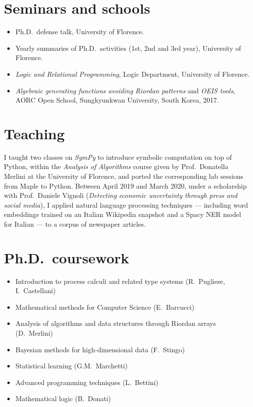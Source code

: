 \documentclass[11pt,a4paper]{article}
\begin{document}
\section*{Seminars and schools}

\begin{itemize}[leftmargin=1.4em,itemsep=0.3em]
\item Ph.D.\ defense talk, University of Florence.
\item Yearly summaries of Ph.D.\ activities (1st, 2nd and 3rd year), University of Florence.
\item \emph{Logic and Relational Programming}, Logic Department, University of Florence.
\item \emph{Algebraic generating functions avoiding Riordan patterns} and \emph{OEIS tools}, AORC Open School, Sungkyunkwan University, South Korea, 2017.
\end{itemize}

\section*{Teaching}

I taught two classes on \emph{SymPy} to introduce symbolic computation on top of Python, within the \emph{Analysis of Algorithms} course given by Prof.\ Donatella Merlini at the University of Florence, and ported the corresponding lab sessions from Maple to Python. Between April 2019 and March 2020, under a scholarship with Prof.\ Daniele Vignoli (\emph{Detecting economic uncertainty through press and social media}), I applied natural language processing techniques --- including word embeddings trained on an Italian Wikipedia snapshot and a Spacy NER model for Italian --- to a corpus of newspaper articles.

\section*{Ph.D.\ coursework}

\begin{itemize}[leftmargin=1.4em,itemsep=0.3em]
\item Introduction to process calculi and related type systems (R.\ Pugliese, I.\ Castellani)
\item Mathematical methods for Computer Science (E.\ Barcucci)
\item Analysis of algorithms and data structures through Riordan arrays (D.\ Merlini)
\item Bayesian methods for high-dimensional data (F.\ Stingo)
\item Statistical learning (G.M.\ Marchetti)
\item Advanced programming techniques (L.\ Bettini)
\item Mathematical logic (B.\ Donati)
\end{itemize}
\end{document}
